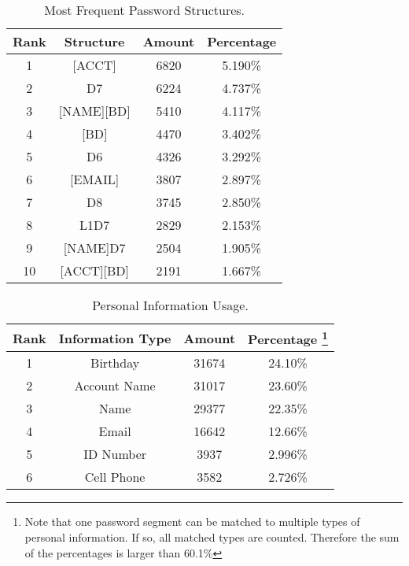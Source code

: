 \begin{table}
\centering
\caption{Most Frequent Password Structures.}
\begin{tabular}{|c|c|c|c|} \hline
Rank&Structure&Amount&Percentage\\ \hline
1&[ACCT]&6820&5.190\%\\
2&D7&6224&4.737\%\\
3&[NAME][BD]&5410&4.117\%\\
4&[BD]&4470&3.402\%\\
5&D6&4326&3.292\%\\
6&[EMAIL]&3807&2.897\%\\
7&D8&3745&2.850\%\\
8&L1D7&2829&2.153\%\\
9&[NAME]D7&2504&1.905\%\\
10&[ACCT][BD]&2191&1.667\%\\
\hline\end{tabular}
\label{t3}
\vspace{-0.1in}
\end{table}

\begin{table}
\centering
\caption{Personal Information Usage.}
\begin{tabular}{|c|c|c|c|} \hline 
Rank & Information Type & Amount & Percentage { \footnote{\small Note
    that one password segment can be matched to multiple types of
    personal information. If so, all matched types are
    counted. Therefore the sum of the percentages is larger than
    60.1\%}}\\ \hline 1&Birthday&31674&24.10\%\\ 2&Account
Name&31017&23.60\%\\ 3&Name&29377&22.35\%\\ 4&Email&16642&12.66\%\\ 5&ID
Number&3937&2.996\%\\ 6&Cell Phone&3582&2.726\%\\ \hline\end{tabular}
\label{t4}
\vspace{-0.1in}
\end{table}


